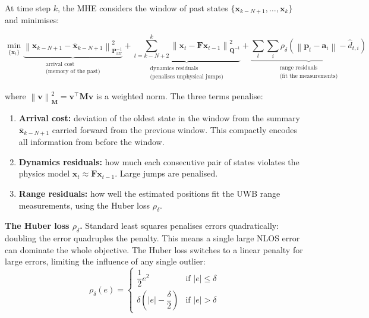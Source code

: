 \documentclass[11pt,a4paper]{article}
\newcommand{\vect}[1]{\bm{#1}}
\newcommand{\mat}[1]{\mathbf{#1}}
\newcommand{\norm}[1]{\left\|#1\right\|}
\newcommand{\abs}[1]{\left|#1\right|}
\newcommand{\Trans}{^{\top}}
\begin{document}
At time step $k$, the MHE considers the window of past states $\{\vect{x}_{k-N+1}, \ldots, \vect{x}_k\}$ and minimises:

\begin{equation}
\min_{\{\vect{x}_t\}} \underbrace{\norm{\vect{x}_{k-N+1} - \bar{\vect{x}}_{k-N+1}}_{\mat{P}_\text{arr}^{-1}}^2}_{\substack{\text{arrival cost}\\\text{(memory of the past)}}} + \underbrace{\sum_{t=k-N+2}^{k} \norm{\vect{x}_t - \mat{F}\vect{x}_{t-1}}_{\mat{Q}^{-1}}^2}_{\substack{\text{dynamics residuals}\\\text{(penalises unphysical jumps)}}} + \underbrace{\sum_{t}\sum_{i} \rho_\delta\!\left(\norm{\vect{p}_t - \vect{a}_i} - \hat{d}_{t,i}\right)}_{\substack{\text{range residuals}\\\text{(fit the measurements)}}}
\label{eq:mhe}
\end{equation}

where $\norm{\vect{v}}_{\mat{M}}^2 = \vect{v}\Trans\mat{M}\vect{v}$ is a weighted norm. The three terms penalise:
\begin{enumerate}[leftmargin=2em]
  \item \textbf{Arrival cost:} deviation of the oldest state in the window from the summary $\bar{\vect{x}}_{k-N+1}$ carried forward from the previous window. This compactly encodes all information from before the window.
  \item \textbf{Dynamics residuals:} how much each consecutive pair of states violates the physics model $\vect{x}_t \approx \mat{F}\vect{x}_{t-1}$. Large jumps are penalised.
  \item \textbf{Range residuals:} how well the estimated positions fit the UWB range measurements, using the Huber loss $\rho_\delta$.
\end{enumerate}

\textbf{The Huber loss $\rho_\delta$.} Standard least squares penalises errors quadratically: doubling the error quadruples the penalty. This means a single large NLOS error can dominate the whole objective. The Huber loss switches to a linear penalty for large errors, limiting the influence of any single outlier:
\begin{equation}
\rho_\delta(e) = \begin{cases}
\dfrac{1}{2}e^2 & \text{if } \abs{e} \leq \delta \\[6pt]
\delta\!\left(\abs{e} - \dfrac{\delta}{2}\right) & \text{if } \abs{e} > \delta
\end{cases}
\label{eq:huber}
\end{equation}
\end{document}
